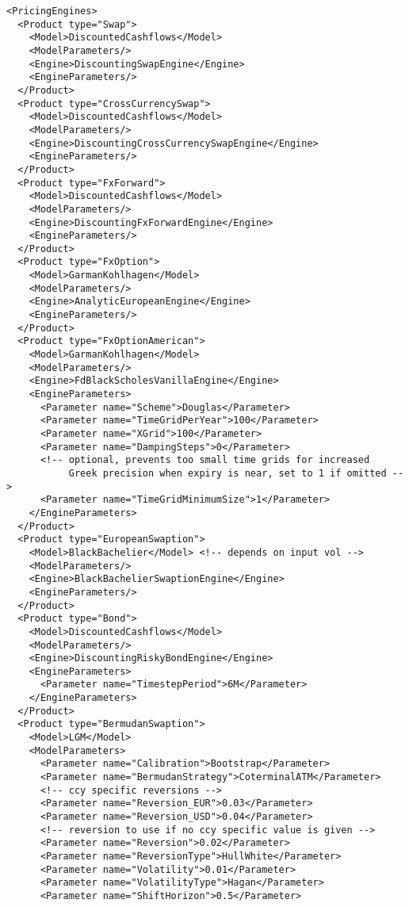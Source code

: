 \begin{longlisting}
\begin{verbatim}
<PricingEngines>
  <Product type="Swap">
    <Model>DiscountedCashflows</Model>
    <ModelParameters/>
    <Engine>DiscountingSwapEngine</Engine>
    <EngineParameters/>
  </Product>
  <Product type="CrossCurrencySwap">
    <Model>DiscountedCashflows</Model>
    <ModelParameters/>
    <Engine>DiscountingCrossCurrencySwapEngine</Engine>
    <EngineParameters/>
  </Product>
  <Product type="FxForward">
    <Model>DiscountedCashflows</Model>
    <ModelParameters/>
    <Engine>DiscountingFxForwardEngine</Engine>
    <EngineParameters/>
  </Product>
  <Product type="FxOption">
    <Model>GarmanKohlhagen</Model>
    <ModelParameters/>
    <Engine>AnalyticEuropeanEngine</Engine>
    <EngineParameters/>
  </Product>
  <Product type="FxOptionAmerican">
    <Model>GarmanKohlhagen</Model>
    <ModelParameters/>
    <Engine>FdBlackScholesVanillaEngine</Engine>
    <EngineParameters>
      <Parameter name="Scheme">Douglas</Parameter>
      <Parameter name="TimeGridPerYear">100</Parameter>
      <Parameter name="XGrid">100</Parameter>
      <Parameter name="DampingSteps">0</Parameter>
      <!-- optional, prevents too small time grids for increased
           Greek precision when expiry is near, set to 1 if omitted -->
      <Parameter name="TimeGridMinimumSize">1</Parameter>
    </EngineParameters>
  </Product>
  <Product type="EuropeanSwaption">
    <Model>BlackBachelier</Model> <!-- depends on input vol -->
    <ModelParameters/>
    <Engine>BlackBachelierSwaptionEngine</Engine>
    <EngineParameters/>
  </Product>
  <Product type="Bond">
    <Model>DiscountedCashflows</Model>
    <ModelParameters/>
    <Engine>DiscountingRiskyBondEngine</Engine>
    <EngineParameters>
      <Parameter name="TimestepPeriod">6M</Parameter>
    </EngineParameters>
  </Product>
  <Product type="BermudanSwaption">
    <Model>LGM</Model>
    <ModelParameters>
      <Parameter name="Calibration">Bootstrap</Parameter>
      <Parameter name="BermudanStrategy">CoterminalATM</Parameter>
      <!-- ccy specific reversions -->
      <Parameter name="Reversion_EUR">0.03</Parameter>
      <Parameter name="Reversion_USD">0.04</Parameter>
      <!-- reversion to use if no ccy specific value is given -->
      <Parameter name="Reversion">0.02</Parameter>
      <Parameter name="ReversionType">HullWhite</Parameter>
      <Parameter name="Volatility">0.01</Parameter>
      <Parameter name="VolatilityType">Hagan</Parameter>
      <Parameter name="ShiftHorizon">0.5</Parameter>

\end{verbatim}
\end{longlisting}

